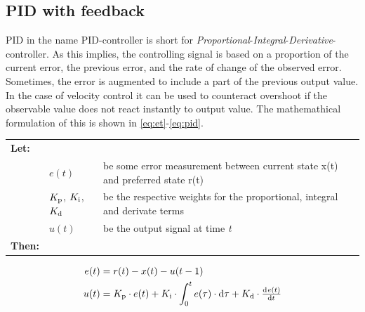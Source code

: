 \documentclass[11pt]{article}
\begin{document}
\subsection{PID with feedback}
PID in the name PID-controller is short for \emph{Proportional}-\emph{Integral}-\emph{Derivative}-controller. As this implies, the controlling signal is based on a proportion of the current error, the previous error, and the rate of change of the observed error. Sometimes, the error is augmented to include a part of the previous output value. In the case of velocity control it can be used to counteract overshoot if the observable value does not react instantly to output value. The mathemathical formulation of this is shown in \ref{eq:et}-\vref*{eq:pid}.\par \vspace{10pt}
{\footnotesize
  \begin{tabular}{l l l}
    \textbf{Let:} \\
 &$e(t)$ &be some error measurement between current state x(t) and preferred state r(t)\\
 &${K_{\textup{p}}}$, ${K_{\textup{i}}}$, ${K_{\textup{d}}}$ &be the respective weights for the proportional, integral and derivate terms \\
 &$u(t)$ &be the output signal at time \emph{t} \\
    \textbf{Then:}
  \end{tabular}
  \begin{align}
    e(t) &= r(t) - x(t) - u(t-1)\label{eq:et}\\
    u(t) &= \di{K}{p}\cdot e(t) + \di{K}{i} \cdot\int_{0}^{t}e(\tau)\cdot \dif\tau + \di{K}{d} \cdot \od{e(t)}{t}\label{eq:pid}
  \end{align}}
\par
\end{document}
